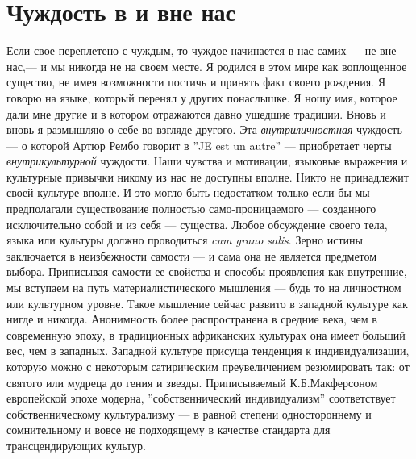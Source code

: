 \documentclass[12pt]{book}
\begin{document}
\section{Чуждость в и вне нас}

Если свое переплетено с чуждым, то чуждое начинается в нас самих --- не вне нас,--- и мы никогда не на своем месте. Я родился в этом мире как воплощенное существо, не имея возможности постичь и принять факт своего рождения. Я говорю на языке, который перенял у других понаслышке. Я ношу имя, которое дали мне другие и в котором отражаются давно ушедшие традиции. Вновь и вновь я размышляю о себе во взгляде другого. Эта \textit{внутриличностная} чуждость --- о которой Артюр Рембо говорит в ''JE est un autre'' --- приобретает черты \textit{внутрикультурной} чуждости. Наши чувства и мотивации, языковые выражения и культурные привычки никому из нас не доступны вполне. Никто не принадлежит своей культуре вполне. И это могло быть недостатком только если бы мы предполагали существование полностью само-проницаемого --- созданного исключительно собой и из себя --- существа. Любое обсуждение своего тела, языка или культуры должно проводиться \textit{cum grano salis}. Зерно истины заключается в неизбежности самости --- и сама она не является предметом выбора. Приписывая самости ее свойства и способы проявления как внутренние, мы вступаем на путь материалистического мышления --- будь то на личностном или культурном уровне. Такое мышление сейчас развито в западной культуре как нигде и никогда. Анонимность более распространена в средние века, чем в современную эпоху, в традиционных африканских культурах она имеет больший вес, чем в западных. Западной культуре присуща тенденция к индивидуализации, которую можно с некоторым сатирическим преувеличением резюмировать так: от святого или мудреца до гения и звезды. Приписываемый К.Б.Макферсоном европейской эпохе модерна, ''собственнический индивидуализм'' соответствует собственническому культурализму --- в равной степени одностороннему и сомнительному и вовсе не подходящему в качестве стандарта для трансцендирующих культур.
\end{document}
